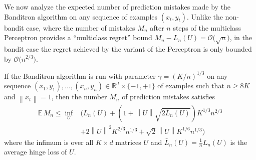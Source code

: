 \documentclass[11pt]{hackednow}
\newcommand{\E}{\mathbb{E}}
\newcommand{\R}{\mathbb{R}}
\newcommand{\norm}[1]{\left\|{#1}\right\|}
\begin{document}
We now analyze the expected number of prediction mistakes made by the Banditron algorithm on any sequence of examples $(x_t,y_t)$. Unlike the non-bandit case, where the number of mistakes $M_n$
after $n$ steps of the multiclass Perceptron provides a ``multiclass regret'' bound $M_n - L_n(U) = \mathcal{O}\bigl(\sqrt{n}\bigr)$, in the bandit case the regret achieved by the variant of the Perceptron is only bounded by $\mathcal{O}\bigl(n^{2/3}\bigr)$.
\begin{theorem}
If the Banditron algorithm is run with parameter $\gamma = (K/n)^{1/3}$ on any sequence $(x_1,y_1),\dots,(x_n,y_n) \in \R^d\times\{-1,+1\}$ of examples such that $n \ge 8K$ and $\norm{x_t} = 1$, then the number $M_n$ of prediction mistakes satisfies
\begin{align*}
    \E\,M_n
\le
    \inf_{U}&\biggl( L_n(U) + \left(1 + \norm{U}\sqrt{2\bar{L}_n(U)}\right)K^{1/3}n^{2/3}
\\ &+ 2\norm{U}^2 K^{2/3}n^{1/3} + \sqrt{2}\norm{U} K^{1/6}n^{1/3}\biggr)
\end{align*}
where the infimum is over all $K \times d$ matrices $U$ and $\bar{L}_n(U) = \tfrac{1}{n}L_n(U)$ is the average hinge loss of $U$.
\end{theorem}
\end{document}
